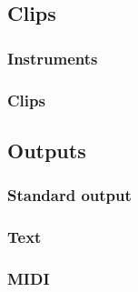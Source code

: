 \documentclass[11pt,twoside]{article}
\begin{document}
\subsection{Clips}

\subsubsection{Instruments}

\subsubsection{Clips}

\subsection{Outputs}

\subsubsection{Standard output}

\subsubsection{Text}

\subsubsection{MIDI}
\end{document}
